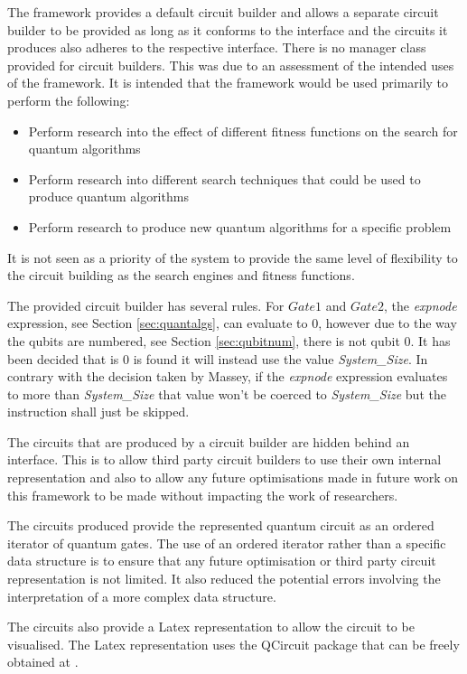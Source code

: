 The framework provides a default circuit builder and allows a separate circuit builder to be provided as long as it conforms to the interface and the circuits it produces also adheres to the respective interface.
There is no manager class provided for circuit builders.
This was due to an assessment of the intended uses of the framework.
It is intended that the framework would be used primarily to perform the following:
\begin{itemize}
  \item Perform research into the effect of different fitness functions on the search for quantum algorithms
  \item Perform research into different search techniques that could be used to produce quantum algorithms
  \item Perform research to produce new quantum algorithms for a specific problem
\end{itemize}

It is not seen as a priority of the system to provide the same level of flexibility to the circuit building as the search engines and fitness functions.

The provided circuit builder has several rules.
For $Gate1$ and $Gate2$, the \emph{expnode} expression, see Section \ref{sec:quantalgs}, can evaluate to $0$, however due to the way the qubits are numbered, see Section \ref{sec:qubitnum}, there is not qubit $0$.
It has been decided that is $0$ is found it will instead use the value \emph{System\_Size}.
In contrary with the decision taken by Massey\cite{masseythesis}, if the \emph{expnode} expression evaluates to more than \emph{System\_Size} that value won't be coerced to \emph{System\_Size} but the instruction shall just be skipped.

The circuits that are produced by a circuit builder are hidden behind an interface.
This is to allow third party circuit builders to use their own internal representation and also to allow any future optimisations made in future work on this framework to be made without impacting the work of researchers.

The circuits produced provide the represented quantum circuit as an ordered iterator of quantum gates.
The use of an ordered iterator rather than a specific data structure is to ensure that any future optimisation or third party circuit representation is not limited.
It also reduced the potential errors involving the interpretation of a more complex data structure.

The circuits also provide a Latex representation to allow the circuit to be visualised.
The Latex representation uses the QCircuit package that can be freely obtained at \cite{QCsite}.

